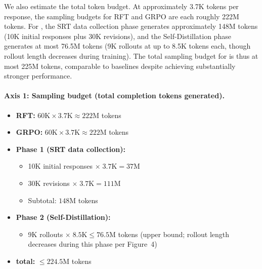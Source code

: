 We also estimate the total token budget. At approximately 3.7K tokens per response, the sampling budgets for RFT and GRPO are each roughly 222M tokens. For \ours{}, the SRT data collection phase generates approximately 148M tokens (10K initial responses plus 30K revisions), and the Self-Distillation phase generates at most 76.5M tokens (9K rollouts at up to 8.5K tokens each, though rollout length decreases during training). The total sampling budget for \ours{} is thus at most 225M tokens, comparable to baselines despite achieving substantially stronger performance.

\paragraph{Axis 1: Sampling budget (total completion tokens generated).}
\begin{itemize}
    \item \textbf{RFT:} $60\text{K} \times 3.7\text{K} \approx 222\text{M}$ tokens
    \item \textbf{GRPO:} $60\text{K} \times 3.7\text{K} \approx 222\text{M}$ tokens
    \item \textbf{\ours{} Phase 1 (SRT data collection):}
    \begin{itemize}
        \item 10K initial responses $\times\; 3.7\text{K} = 37\text{M}$
        \item 30K revisions $\times\; 3.7\text{K} = 111\text{M}$
        \item Subtotal: $148\text{M}$ tokens
    \end{itemize}
    \item \textbf{\ours{} Phase 2 (Self-Distillation):}
    \begin{itemize}
        \item 9K rollouts $\times\; 8.5\text{K} \leq 76.5\text{M}$ tokens (upper bound; rollout length decreases during this phase per Figure~4)
    \end{itemize}
    \item \textbf{\ours{} total:} $\leq 224.5\text{M}$ tokens
\end{itemize}

